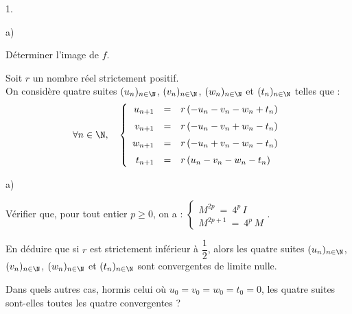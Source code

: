 \documentclass[11pt]{article}%
\begin{document}
\begin{exerciceAP}
\begin{noliste}{1.}
\begin{noliste}{a)}
    \item Déterminer l'image de $f$.
    \end{noliste}
    
  \item Soit $r$ un nombre réel strictement positif.\\
    On considère quatre suites $(u_n)_{n \in \N}$, $(v_n)_{n \in \N}$,
    $(w_n)_{n \in \N}$ et $(t_n)_{n \in \N}$ telles que :
    \[
      \forall n \in \N, \quad \left\{
        \begin{array}{rcl}
          u_{n+1} & = & r \, (-u_n-v_n-w_n+t_n)
          \\[.2cm]
          v_{n+1} & = & r \, (-u_n-v_n +w_n-t_n)
          \\[.2cm]
          w_{n+1} & = & r \, (-u_n +v_n -w_n -t_n)
          \\[.2cm]
          t_{n+1} & = & r \, (u_n -v_n -w_n -t_n)
        \end{array}
      \right.
    \]
    \begin{noliste}{a)}
      \setlength{\itemsep}{2mm}
    \item Vérifier que, pour tout entier $p \geq 0$, on a : $\left\{
        \begin{array}{l}
          M^{2p} \ = \ 4^p \, I
          \\[.2cm]
          M^{2p+1} \ = \ 4^p \, M
        \end{array}
      \right.$.
      
    \item En déduire que si $r$ est strictement inférieur à
      $\dfrac{1}{2}$, alors les quatre suites $(u_n)_{n \in \N}$,
      $(v_n)_{n \in \N}$, $(w_n)_{n \in \N}$ et $(t_n)_{n \in \N}$
      sont convergentes de limite nulle.
      
    \item Dans quels autres cas, hormis celui où $u_0 = v_0 = w_0 =
      t_0 = 0$, les quatre suites sont-elles toutes les quatre
      convergentes ?
    \end{noliste}
  \end{noliste}
\end{exerciceAP}
\end{document}
